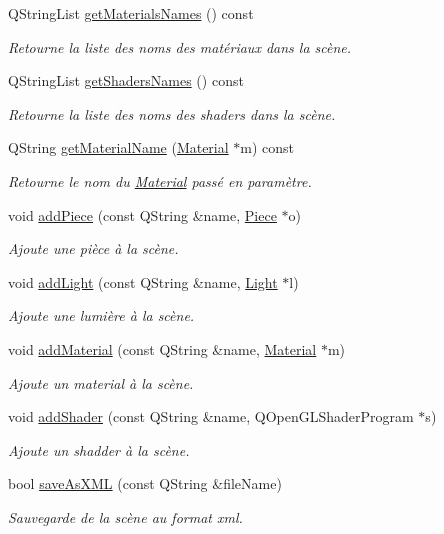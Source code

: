 \begin{DoxyCompactItemize}
Q\+String\+List \hyperlink{class_scene_a481bf791889936bf3521c849bc4c7c2f}{get\+Materials\+Names} () const 
\begin{DoxyCompactList}\small\item\em Retourne la liste des noms des matériaux dans la scène. \end{DoxyCompactList}\item 
Q\+String\+List \hyperlink{class_scene_ae8045c3444b367c070988b30d69e5a36}{get\+Shaders\+Names} () const 
\begin{DoxyCompactList}\small\item\em Retourne la liste des noms des shaders dans la scène. \end{DoxyCompactList}\item 
Q\+String \hyperlink{class_scene_accd8407f070358c3d6744994df93a92d}{get\+Material\+Name} (\hyperlink{class_material}{Material} $\ast$m) const 
\begin{DoxyCompactList}\small\item\em Retourne le nom du \hyperlink{class_material}{Material} passé en paramètre. \end{DoxyCompactList}\item 
void \hyperlink{class_scene_a6c40a38ef472e73ddee697f813b8e587}{add\+Piece} (const Q\+String \&name, \hyperlink{class_piece}{Piece} $\ast$o)
\begin{DoxyCompactList}\small\item\em Ajoute une pièce à la scène. \end{DoxyCompactList}\item 
void \hyperlink{class_scene_aedf1b6729e0feda58666662c349ffed1}{add\+Light} (const Q\+String \&name, \hyperlink{class_light}{Light} $\ast$l)
\begin{DoxyCompactList}\small\item\em Ajoute une lumière à la scène. \end{DoxyCompactList}\item 
void \hyperlink{class_scene_a68761479fea650973d31e2d9565f8aca}{add\+Material} (const Q\+String \&name, \hyperlink{class_material}{Material} $\ast$m)
\begin{DoxyCompactList}\small\item\em Ajoute un material à la scène. \end{DoxyCompactList}\item 
void \hyperlink{class_scene_ad15253a331423b1e3c3fb2484b10509c}{add\+Shader} (const Q\+String \&name, Q\+Open\+G\+L\+Shader\+Program $\ast$s)
\begin{DoxyCompactList}\small\item\em Ajoute un shadder à la scène. \end{DoxyCompactList}\item 
bool \hyperlink{class_scene_a696a59602fa780cd7904df5c50b94eae}{save\+As\+X\+M\+L} (const Q\+String \&file\+Name)
\begin{DoxyCompactList}\small\item\em Sauvegarde de la scène au format xml. \end{DoxyCompactList}\end{DoxyCompactItemize}
